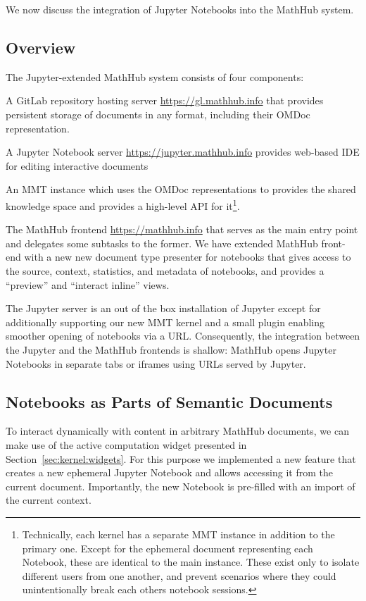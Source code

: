 We now discuss the integration of Jupyter Notebooks into the MathHub system.

\subsection{Overview}

The Jupyter-extended MathHub system consists of four components:
\begin{compactenum}
\item A GitLab repository hosting server \url{https://gl.mathhub.info} that provides persistent storage of documents in any format, including their OMDoc representation.
\item A Jupyter Notebook server \url{https://jupyter.mathhub.info} provides web-based IDE for editing interactive documents
\item An MMT instance which uses the OMDoc representations to provides the shared knowledge space and provides a high-level API for it\footnote{
    Technically, each kernel has a separate MMT instance in addition to the primary one. 
    Except for the ephemeral document representing each Notebook, these are identical to the main instance. 
    These exist only to isolate different users from one another, and prevent scenarios where they could unintentionally break each others notebook sessions.  
  }.
\item The MathHub frontend \url{https://mathhub.info} that serves as the main entry point and delegates some subtasks to the former.
  We have extended MathHub front-end with a new new document type presenter for notebooks that gives access to the source, context, statistics, and metadata of notebooks, and provides a ``preview'' and ``interact inline'' views.  
\end{compactenum}

The Jupyter server is an out of the box installation of Jupyter except for additionally supporting our new MMT kernel and a small plugin enabling smoother opening of notebooks via a URL. 
Consequently, the integration between the Jupyter and the MathHub frontends is shallow: MathHub opens Jupyter Notebooks in separate tabs or iframes using URLs served by Jupyter.

\subsection{Notebooks as Parts of Semantic Documents}

To interact dynamically with content in arbitrary MathHub documents, we can make use of the active computation widget presented in Section~\ref{sec:kernel:widgets}. 
For this purpose we implemented a new feature that creates a new ephemeral Jupyter Notebook and allows accessing it from the current document. 
Importantly, the new Notebook is pre-filled with an import of the current context. 

